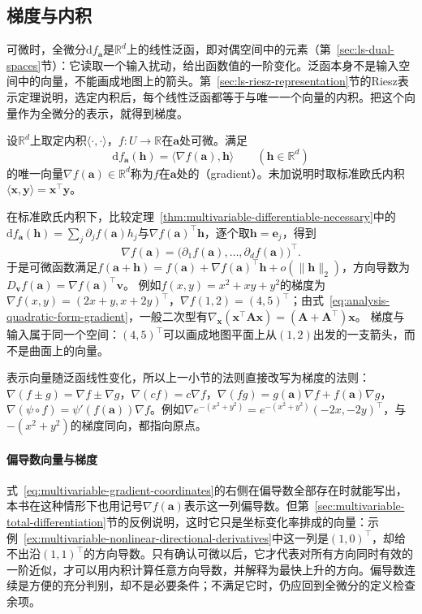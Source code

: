 \subsection{梯度与内积}
\label{sec:multivariable-gradient-inner-product}

可微时，全微分$\mathrm df_{\bm a}$是$\mathbb R^d$上的线性泛函，即对偶空间中的元素（第~\ref{sec:ls-dual-spaces}节）：它读取一个输入扰动，给出函数值的一阶变化。泛函本身不是输入空间中的向量，不能画成地图上的箭头。第~\ref{sec:ls-riesz-representation}节的Riesz表示定理说明，选定内积后，每个线性泛函都等于与唯一一个向量的内积。把这个向量作为全微分的表示，就得到梯度。
\begin{definition}[梯度]
\label{def:multivariable-gradient}
设$\mathbb R^d$上取定内积$\langle\cdot,\cdot\rangle$，$f:U\to\mathbb R$在$\bm a$处可微。满足
\[
 \mathrm df_{\bm a}(\bm h)=\langle\nabla f(\bm a),\bm h\rangle\qquad(\bm h\in\mathbb R^d)
\]
的唯一向量$\nabla f(\bm a)\in\mathbb R^d$称为$f$在$\bm a$处的（gradient）。未加说明时取标准欧氏内积$\langle\bm x,\bm y\rangle=\bm x^\top\bm y$。
\end{definition}
在标准欧氏内积下，比较定理~\ref{thm:multivariable-differentiable-necessary}中的$\mathrm df_{\bm a}(\bm h)=\sum_j\partial_jf(\bm a)h_j$与$\nabla f(\bm a)^\top\bm h$，逐个取$\bm h=\bm e_j$，得到
\begin{equation}
 \nabla f(\bm a)=\bigl(\partial_1f(\bm a),\ldots,\partial_df(\bm a)\bigr)^\top .
\label{eq:multivariable-gradient-coordinates}
\end{equation}
于是可微函数满足$f(\bm a+\bm h)=f(\bm a)+\nabla f(\bm a)^\top\bm h+o(\lVert\bm h\rVert_2)$，方向导数为$D_{\bm v}f(\bm a)=\nabla f(\bm a)^\top\bm v$。
例如$f(x,y)=x^2+xy+y^2$的梯度为$\nabla f(x,y)=(2x+y,x+2y)^\top$，$\nabla f(1,2)=(4,5)^\top$；由式~\eqref{eq:analysis-quadratic-form-gradient}，一般二次型有$\nabla_{\bm x}(\bm x^\top\bm A\bm x)=(\bm A+\bm A^\top)\bm x$。
梯度与输入属于同一个空间：$(4,5)^\top$可以画成地图平面上从$(1,2)$出发的一支箭头，而不是曲面上的向量。

表示向量随泛函线性变化，所以上一小节的法则直接改写为梯度的法则：$\nabla(f\pm g)=\nabla f\pm\nabla g$，$\nabla(cf)=c\nabla f$，$\nabla(fg)=g(\bm a)\nabla f+f(\bm a)\nabla g$，$\nabla(\psi\circ f)=\psi'(f(\bm a))\nabla f$。例如$\nabla e^{-(x^2+y^2)}=e^{-(x^2+y^2)}(-2x,-2y)^\top$，与$-(x^2+y^2)$的梯度同向，都指向原点。

\paragraph{偏导数向量与梯度}
式~\eqref{eq:multivariable-gradient-coordinates}的右侧在偏导数全部存在时就能写出，本书在这种情形下也用记号$\nabla f(\bm a)$表示这一列偏导数。但第~\ref{sec:multivariable-total-differentiation}节的反例说明，这时它只是坐标变化率排成的向量：示例~\ref{ex:multivariable-nonlinear-directional-derivatives}中这一列是$(1,0)^\top$，却给不出沿$(1,1)^\top$的方向导数。只有确认可微以后，它才代表对所有方向同时有效的一阶近似，才可以用内积计算任意方向导数，并解释为最快上升的方向。偏导数连续是方便的充分判别，却不是必要条件；不满足它时，仍应回到全微分的定义检查余项。

